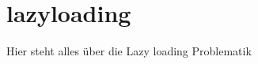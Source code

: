 \section{lazyloading}

Hier steht alles über die Lazy loading Problematik

\label{cha:Lazy loading}
